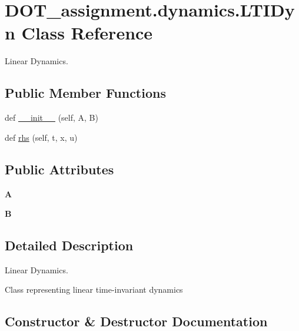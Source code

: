 \hypertarget{class_d_o_t__assignment_1_1dynamics_1_1_l_t_i_dyn}{}\section{D\+O\+T\+\_\+assignment.\+dynamics.\+L\+T\+I\+Dyn Class Reference}
\label{class_d_o_t__assignment_1_1dynamics_1_1_l_t_i_dyn}


Linear Dynamics.  


\subsection*{Public Member Functions}
\begin{DoxyCompactItemize}
\item 
def \mbox{\hyperlink{class_d_o_t__assignment_1_1dynamics_1_1_l_t_i_dyn_ae9fd78b382de1c3b12fe9b66ef493135}{\+\_\+\+\_\+init\+\_\+\+\_\+}} (self, A, B)
\item 
def \mbox{\hyperlink{class_d_o_t__assignment_1_1dynamics_1_1_l_t_i_dyn_a0dc3f0dfdbdc223af24ca048858ec02e}{rhs}} (self, t, x, u)
\end{DoxyCompactItemize}
\subsection*{Public Attributes}
\begin{DoxyCompactItemize}
\item 
\mbox{\label{class_d_o_t__assignment_1_1dynamics_1_1_l_t_i_dyn_ae114e0e285737ce44939e97a940c8b07}} 
{\bfseries A}
\item 
\mbox{\label{class_d_o_t__assignment_1_1dynamics_1_1_l_t_i_dyn_a153320385ebcf731bcbc66fa456d0d09}} 
{\bfseries B}
\end{DoxyCompactItemize}


\subsection{Detailed Description}
Linear Dynamics. 

\begin{DoxyVerb}Class representing linear time-invariant dynamics
\end{DoxyVerb}
 

\subsection{Constructor \& Destructor Documentation}
\mbox{\label{class_d_o_t__assignment_1_1dynamics_1_1_l_t_i_dyn_ae9fd78b382de1c3b12fe9b66ef493135}} 
